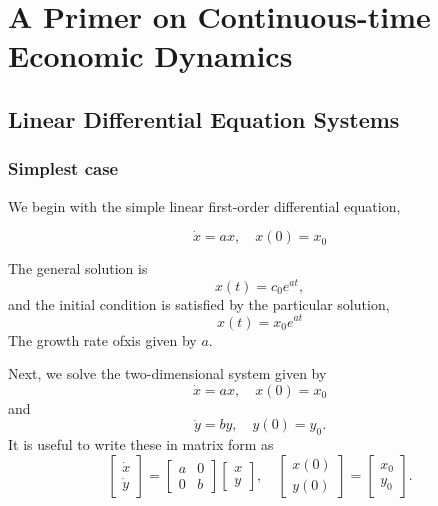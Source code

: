 \documentclass{book}
\begin{document}
\chapter{A Primer on Continuous-time Economic Dynamics}

\section{Linear Differential Equation Systems} %
\label{sec:linear_differential_equation_systems}

\subsection{Simplest case} %
\label{sub:simplest_case}

We begin with the simple linear first-order differential equation,

\begin{equation*}
\dot{x}=ax, \quad x(0)=x_{0}
\end{equation*}

The general solution is
\begin{equation*}
x(t)=c_{0}e^{at},
\end{equation*}
and the initial condition is satisfied by the particular solution,
\begin{equation*}
x(t)=x_{0}e^{at}
\end{equation*}
The growth rate ofxis given by $a$.

Next, we solve the two-dimensional system given by
\begin{equation*}
    \dot{x}=ax,\quad x(0)=x_{0}
\end{equation*}
and
\begin{equation*}
    \dot{y}=by,\quad y(0)=y_{0}.
\end{equation*}
It is useful to write these in matrix form as
\begin{equation*}
\begin{bmatrix}
\dot{x}\\ \dot{y}
\end{bmatrix}
=\begin{bmatrix}
a & 0 \\
0 & b
\end{bmatrix}
\begin{bmatrix}
x\\
y
\end{bmatrix}
,\quad
\begin{bmatrix}
x(0)\\
y(0)
\end{bmatrix}
=\begin{bmatrix}
x_{0}\\y_{0}
\end{bmatrix}.
\end{equation*}
\end{document}
